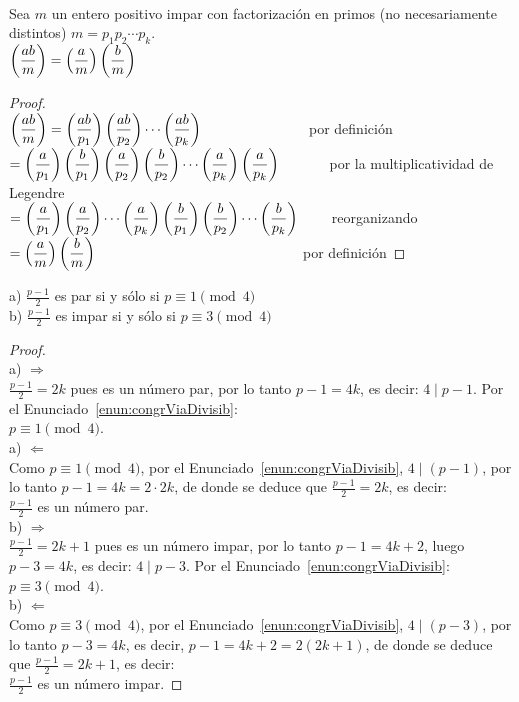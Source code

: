\begin{enunciado} \, \\
Sea $m$ un entero positivo impar con factorización en primos (no necesariamente distintos) $m=p_1p_2\cdots p_k$. \\
$\left(\dfrac{ab}{m}\right) = \left(\dfrac{a}{m}\right) \left(\dfrac{b}{m}\right)$
\end{enunciado}

\begin{proof} \, \\
$\left(\dfrac{ab}{m}\right) = \left(\dfrac{ab}{p_1}\right) \left(\dfrac{ab}{p_2}\right) \cdots \left(\dfrac{ab}{p_k}\right) \qquad \qquad \qquad \quad \;$ por definición \\
$= \left(\dfrac{a}{p_1}\right)\left(\dfrac{b}{p_1}\right) \left(\dfrac{a}{p_2}\right)\left(\dfrac{b}{p_2}\right) \cdots \left(\dfrac{a}{p_k}\right)\left(\dfrac{a}{p_k}\right) \qquad \quad \,$ por la multiplicatividad de Legendre \\
$= \left(\dfrac{a}{p_1}\right)\left(\dfrac{a}{p_2}\right) \cdots \left(\dfrac{a}{p_k}\right) \left(\dfrac{b}{p_1}\right)\left(\dfrac{b}{p_2}\right) \cdots \left(\dfrac{b}{p_k}\right) \qquad$ reorganizando \\
$= \left(\dfrac{a}{m}\right) \left(\dfrac{b}{m}\right) \qquad\qquad\qquad\qquad\qquad\qquad\qquad \; \,$ por definición
\end{proof}

\begin{enunciado}\label{enun:parImpar1raley}\leavevmode\par
a) $\frac{p-1}{2}$ es par si y sólo si $p \equiv 1 \pmod 4$ \\
b) $\frac{p-1}{2}$ es impar si y sólo si $p \equiv 3 \pmod 4$
\end{enunciado}

\begin{proof} \, \\
a) $\Rightarrow$  \\
$\frac{p-1}{2} = 2k$ pues es un número par, por lo tanto $p-1 = 4k$, es decir: $4 \mid p-1$. Por el Enunciado~\ref{enun:congrViaDivisib}: \\
$p\equiv 1 \pmod 4$. \\
a) $\Leftarrow$ \\
Como $p \equiv 1 \pmod 4$, por el Enunciado~\ref{enun:congrViaDivisib}, $4 \mid (p - 1)$, por lo tanto $p-1 = 4k = 2 \cdot 2k$, de donde se deduce que $\frac{p-1}{2} = 2k$, es decir: \\
$\frac{p-1}{2}$ es un número par. \\
b) $\Rightarrow$  \\
$\frac{p-1}{2} = 2k+1$ pues es un número impar, por lo tanto $p-1 = 4k+2$, luego $p-3 = 4k$, es decir: $4 \mid p-3$. Por el Enunciado~\ref{enun:congrViaDivisib}: \\
$p\equiv 3 \pmod 4$. \\
b) $\Leftarrow$ \\
Como $p \equiv 3 \pmod 4$, por el Enunciado~\ref{enun:congrViaDivisib}, $4 \mid (p - 3)$, por lo tanto $p-3 = 4k$, es decir, $p-1 = 4k+2 = 2(2k+1)$, de donde se deduce que $\frac{p-1}{2} = 2k+1$, es decir: \\
$\frac{p-1}{2}$ es un número impar. 
\end{proof}

